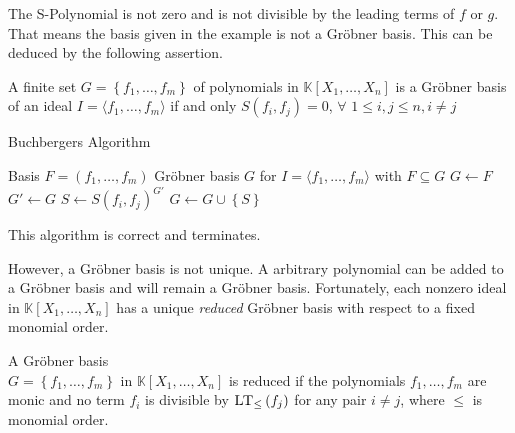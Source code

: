 The S-Polynomial is not zero and is not divisible by the leading terms of $f$ or $g$. That means the basis given in the example is not a Gröbner basis. This can be deduced by the following assertion.

\begin{env_definition}
\cite{KHZ} A finite set $G = \left\lbrace f_{1}, \dots , f_{m} \right\rbrace$ of polynomials in $ \mathbb{K}\left[X_{1}, \dots, X_{n}\right] $ is a Gröbner basis of an ideal 
$I = \langle f_{1}, \dots , f_{m} \rangle $ if and only $S\left( f_{i},f_{j}\right) = 0$, $ \forall$  $1 \leq i,j \leq n, i\neq j $

\end{env_definition}

\begin{algorithm}
\caption{Buchbergers Algorithm \cite{KHZ}}
\label{alg:buchberger}
\begin{algorithmic}[1]
\Require Basis $F = \left( f_{1}, \dots, f_{m} \right)  $
\Ensure Gröbner basis $G$ for $I = \langle f_{1}, \dots, f_{m} \rangle $ with $ F \subseteq G $
\State $G \gets F$
\Repeat
\State $G'\gets G $
\State $S \gets S\left( f_{i},f_{j} \right)^{G'}  $ 
\State $G \gets G \cup \left\lbrace S\right\rbrace $
\EndIf
\EndFor
{}

\end{algorithmic}
\end{algorithm}

This algorithm is correct and terminates.\cite{KHZ}

\newpage

However, a Gröbner basis is not unique. A arbitrary polynomial can be added to a Gröbner basis and will remain a Gröbner basis.
Fortunately, each nonzero ideal in $\mathbb{K}\left[X_{1}, \dots, X_{n}\right]$ has a unique \textit{reduced} Gröbner basis with respect to a fixed monomial order.

\begin{env_definition}
\cite{KHZ}
A Gröbner basis \\ $G= \left\lbrace  f_{1}, \dots , f_{m} \right\rbrace  $ in 
$ \mathbb{K}\left[X_{1}, \dots, X_{n}\right] $ is reduced if the polynomials $f_{1},\dots , f_{m} $ are monic and no term $f_{i}$ is divisible by $ \textsc{LT}_{\leq }\left( f_{j}\right)$ for any pair $i\neq j$, where $\leq$ is monomial order.
\end{env_definition}



